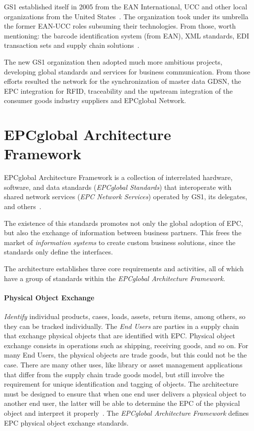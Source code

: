 GS1 established itself in 2005 from the \gls{EAN} International, \gls{UCC} and other local organizations from the United States~\cite{PublicationLEBENSMITTELZEITUNGa}.
The organization took under its umbrella the former EAN-UCC roles subsuming their technologies. From those, worth mentioning: the barcode identification system (from \gls{EAN}), \gls{XML} standards, \gls{EDI} transaction sets and \gls{supply chain} solutions~\cite[p.~212]{lahiriRFIDSourcebook2005}.

The new GS1 organization then adopted much more ambitious projects, developing global standards and services for business communication.
From those efforts resulted the network for the synchronization of master data \gls{GDSN}, the \gls{EPC} integration for \gls{RFID}, traceability and the upstream integration of the consumer goods industry suppliers and EPCglobal Network.

\section{EPCglobal Architecture Framework}

EPCglobal Architecture Framework is a collection of interrelated hardware, software, and data standards (\emph{EPCglobal Standards}) that interoperate with shared network services (\emph{EPC Network Services}) operated by GS1, its delegates, and others~\cite{Architecture6framework20140414Pdf}.

The existence of this standards promotes not only the global adoption of \gls{EPC}, but also the exchange of information between business partners. This frees the market of \emph{information systems} to create custom business solutions, since the standards only define the interfaces.

The architecture establishes three core requirements and activities, all of which have a group of standards within the \emph{EPCglobal Architecture Framework}.

\paragraph{Physical Object Exchange} 

\emph{Identify} individual products, cases, loads, assets, return items, among others, so they can be tracked individually.
The \emph{End Users} are parties in a supply chain that exchange physical objects that are identified with \gls{EPC}.
Physical object exchange consists in operations such as shipping, receiving goods, and so on.
For many End Users, the physical objects are trade goods, but this could not be the case.
There are many other uses, like library or asset management applications~\cite{dong-yingliDesignInternetThings2016} that differ from the \gls{supply chain} trade goods model, but still involve the requirement for unique identification and tagging of objects. 
The architecture must be designed to ensure that when one end user delivers a physical object to another end user, the latter will be able to determine the \gls{EPC} of the physical object and interpret it properly~\cite{Architecture6framework20140414Pdf}.
The \emph{EPCglobal Architecture Framework} defines \gls{EPC} physical object exchange standards.

